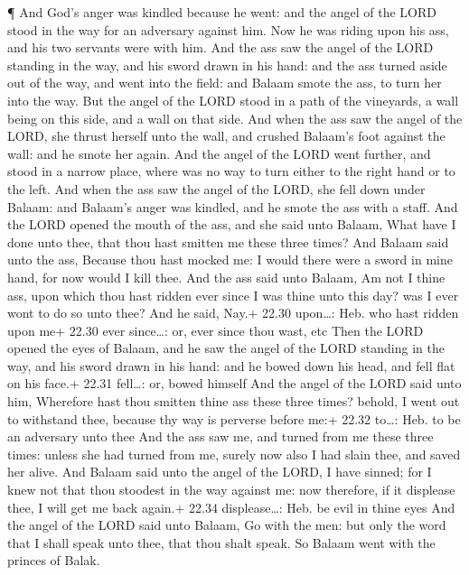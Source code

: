  ¶ And God's anger was kindled because he went: and the
angel of the LORD stood in the way for an adversary against him. Now he
was riding upon his ass, and his two servants were with him.
 And the ass saw the angel of the LORD standing in the way,
and his sword drawn in his hand: and the ass turned aside out of the
way, and went into the field: and Balaam smote the ass, to turn her into
the way.  But the angel of the LORD stood in a path of the
vineyards, a wall being on this side, and a wall on that side.
 And when the ass saw the angel of the LORD, she thrust
herself unto the wall, and crushed Balaam's foot against the wall: and
he smote her again.  And the angel of the LORD went
further, and stood in a narrow place, where was no way to turn either to
the right hand or to the left.  And when the ass saw the
angel of the LORD, she fell down under Balaam: and Balaam's anger was
kindled, and he smote the ass with a staff.  And the LORD
opened the mouth of the ass, and she said unto Balaam, What have I done
unto thee, that thou hast smitten me these three times? 
And Balaam said unto the ass, Because thou hast mocked me: I would there
were a sword in mine hand, for now would I kill thee.  And
the ass said unto Balaam, Am not I thine ass, upon which thou hast
ridden ever since I was thine unto this day? was I ever wont to do so
unto thee? And he said, Nay.+ 22.30 upon\ldots: Heb. who hast ridden
upon me+ 22.30 ever since\ldots: or, ever since thou wast, etc
 Then the LORD opened the eyes of Balaam, and he saw the
angel of the LORD standing in the way, and his sword drawn in his hand:
and he bowed down his head, and fell flat on his face.+ 22.31
fell\ldots: or, bowed himself  And the angel of the LORD
said unto him, Wherefore hast thou smitten thine ass these three times?
behold, I went out to withstand thee, because thy way is perverse before
me:+ 22.32 to\ldots: Heb. to be an adversary unto thee  And
the ass saw me, and turned from me these three times: unless she had
turned from me, surely now also I had slain thee, and saved her alive.
 And Balaam said unto the angel of the LORD, I have sinned;
for I knew not that thou stoodest in the way against me: now therefore,
if it displease thee, I will get me back again.+ 22.34 displease\ldots:
Heb. be evil in thine eyes  And the angel of the LORD said
unto Balaam, Go with the men: but only the word that I shall speak unto
thee, that thou shalt speak. So Balaam went with the princes of Balak.

